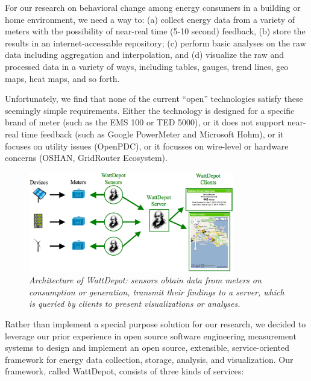 \documentclass[conference,compsoc]{IEEEtran}
\begin{document}
For our research on behavioral change among energy consumers in a building
or home environment, we need a way to: (a) collect energy data from a
variety of meters with the possibility of near-real time (5-10 second)
feedback, (b) store the results in an internet-accessable repository; (c)
perform basic analyses on the raw data including aggregation and
interpolation, and (d) visualize the raw and processed data in a variety of
ways, including tables, gauges, trend lines, geo maps, heat maps, and so forth.

Unfortunately, we find that none of the current ``open'' technologies
satisfy these seemingly simple requirements. Either the technology is
designed for a specific brand of meter (such as the EMS 100 or TED 5000), or it does not
support near-real time feedback (such as Google PowerMeter and Microsoft
Hohm), or it focuses on utility issues (OpenPDC), or it focusses on
wire-level or hardware concerns (OSHAN, GridRouter Ecosystem).


\begin{figure}[!th]
  \center
  \includegraphics[width=0.8\textwidth]{architecture.eps}
  \caption{\em \small Architecture of WattDepot: sensors obtain data from
    meters on consumption or generation, transmit their findings to a
    server, which is queried by clients to present visualizations or analyses.}
  \label{fig:architecture}
\end{figure} 

Rather than implement a special purpose solution for our research, we
decided to leverage our prior experience in open source software
engineering measurement systems to design and implement an open source,
extensible, service-oriented framework for energy data collection, storage,
analysis, and visualization. Our framework, called WattDepot, consists of
three kinds of services:
\end{document}
